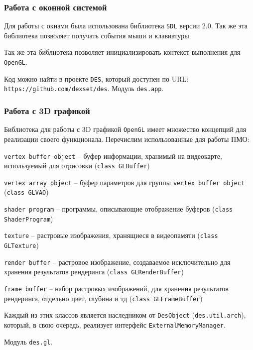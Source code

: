 \subsubsection{Работа с оконной системой}

Для работы с окнами была использована библиотека \verb|SDL| версии 2.0.
Так же эта библиотека позволяет получать события мыши и клавиатуры.

Так же эта библиотека позволяет инициализировать контекст выполнения для \verb|OpenGL|.

Код можно найти в проекте \verb|DES|, который доступен по URL: \verb|https://github.com/dexset/des|.
Модуль \verb|des.app|.

\newpage
\subsubsection{Работа с 3D графикой}

Библиотека для работы с 3D графикой \verb|OpenGL| имеет множество концепций для реализации
своего функционала. Перечислим использованные для работы ПМО:

\begin{mintemize}
\item \verb|vertex buffer object| -- буфер информации,
    хранимый на видеокарте, используемый для отрисовки
    (\verb|class GLBuffer|)
\item \verb|vertex array object| -- буфер параметров для
    группы \verb|vertex buffer object| (\verb|class GLVAO|)
\item \verb|shader program| -- программы, описывающие
    отображение буферов \linebreak (\verb|class ShaderProgram|)
\item \verb|texture| -- растровые изображения, хранящиеся
    в видеопамяти (\verb|class GLTexture|)
\item \verb|render buffer| -- растровое изображение, создаваемое
    исключительно для хранения результатов рендеринга
    (\verb|class GLRenderBuffer|)
\item \verb|frame buffer| -- набор растровых изображений,
    для хранения результатов рендеринга, отдельно цвет,
    глубина и тд (\verb|class GLFrameBuffer|)
\end{mintemize}

Каждый из этих классов является наследником от \verb|DesObject|
(\verb|des.util.arch|), который, в свою очередь, реализует интерфейс \verb|ExternalMemoryManager|.

Модуль \verb|des.gl|.

